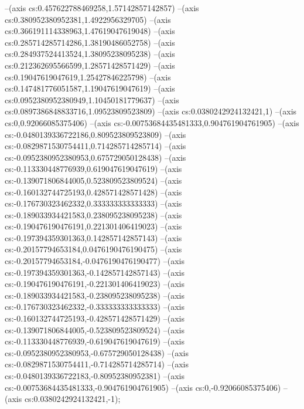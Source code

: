 --(axis cs:0.457622788469258,1.57142857142857)
--(axis cs:0.380952380952381,1.4922956329705)
--(axis cs:0.366191114338963,1.47619047619048)
--(axis cs:0.285714285714286,1.38190486052758)
--(axis cs:0.284937524413524,1.38095238095238)
--(axis cs:0.212362695566599,1.28571428571429)
--(axis cs:0.19047619047619,1.25427846225798)
--(axis cs:0.147481776051587,1.19047619047619)
--(axis cs:0.0952380952380949,1.10450181779637)
--(axis cs:0.0897386848833716,1.09523809523809)
--(axis cs:0.0380242924132421,1)
--(axis cs:0,0.92066085375406)
--(axis cs:-0.00753684435481333,0.904761904761905)
--(axis cs:-0.0480139336722186,0.809523809523809)
--(axis cs:-0.0829871530754411,0.714285714285714)
--(axis cs:-0.0952380952380953,0.675729050128438)
--(axis cs:-0.113330448776939,0.619047619047619)
--(axis cs:-0.139071806844005,0.523809523809524)
--(axis cs:-0.160132744725193,0.428571428571428)
--(axis cs:-0.176730323462332,0.333333333333333)
--(axis cs:-0.189033934421583,0.238095238095238)
--(axis cs:-0.190476190476191,0.221301406419023)
--(axis cs:-0.197394359301363,0.142857142857143)
--(axis cs:-0.20157794653184,0.0476190476190475)
--(axis cs:-0.20157794653184,-0.0476190476190477)
--(axis cs:-0.197394359301363,-0.142857142857143)
--(axis cs:-0.190476190476191,-0.221301406419023)
--(axis cs:-0.189033934421583,-0.238095238095238)
--(axis cs:-0.176730323462332,-0.333333333333333)
--(axis cs:-0.160132744725193,-0.428571428571429)
--(axis cs:-0.139071806844005,-0.523809523809524)
--(axis cs:-0.113330448776939,-0.619047619047619)
--(axis cs:-0.0952380952380953,-0.675729050128438)
--(axis cs:-0.0829871530754411,-0.714285714285714)
--(axis cs:-0.0480139336722183,-0.80952380952381)
--(axis cs:-0.00753684435481333,-0.904761904761905)
--(axis cs:0,-0.92066085375406)
--(axis cs:0.0380242924132421,-1);

